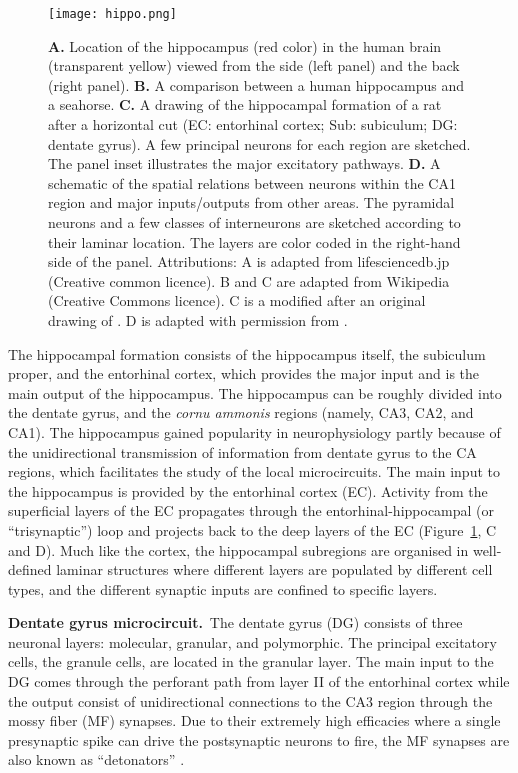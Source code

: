     \begin{figure}
      \center
      \texttt{[image: hippo.png]}
      \caption{
        {\bf A.} Location of the hippocampus (red color) in the human brain
        (transparent yellow) viewed from the side (left panel) and the back
        (right panel).
        {\bf B.} A comparison between a human hippocampus and a seahorse.
        {\bf C.} A drawing of the hippocampal formation of a rat after a
        horizontal cut (EC: entorhinal cortex; Sub: subiculum; DG: dentate
        gyrus). A few principal neurons for each region are sketched. The
        panel inset illustrates the major excitatory pathways.
        {\bf D.} A schematic of the spatial relations between neurons within
        the CA1 region and major inputs/outputs from other areas. The pyramidal
        neurons and a few classes of interneurons are sketched according to
        their laminar location. The layers are color coded in the right-hand
        side of the panel.
        Attributions:
        A is adapted from lifesciencedb.jp (Creative common licence). B and C
        are adapted from Wikipedia (Creative Commons licence). C is a modified
        after an original drawing of \cite{Cajal1911}. D is adapted with
        permission from \cite{Somogyi2014}.
             }
    \label{fig:hp}
    \end{figure}

    The hippocampal formation consists of the hippocampus itself, the
    subiculum proper, and the entorhinal cortex,
    which provides the major input and is the main output of the hippocampus.
    The hippocampus can be roughly divided into the dentate gyrus, and the {\it cornu
    ammonis} regions (namely, CA3, CA2, and CA1). The hippocampus gained
    popularity in neurophysiology partly because of the unidirectional
    transmission of information from dentate gyrus to the CA regions, which
    facilitates the study of the local microcircuits. The main input to the
    hippocampus is provided by the entorhinal cortex (EC). Activity from the
    superficial layers of the EC propagates through the entorhinal-hippocampal
    (or ``trisynaptic'') loop and projects back to the deep layers of the EC
    (Figure~\ref{fig:hp}, C and D). Much like the cortex, the
    hippocampal subregions are organised in well-defined laminar structures
    where different layers are populated by different cell types, and the
    different synaptic inputs are confined to specific layers. 

    \textbf{Dentate gyrus microcircuit.}\,
    The dentate gyrus (DG) consists of three neuronal layers: molecular,
    granular, and polymorphic. The principal excitatory cells, the granule
    cells, are located in the granular layer. The main input to the DG comes
    through the perforant path from layer II of the entorhinal cortex
    \citep{Squire1992} while the output consist of unidirectional connections
    to the CA3 region through the mossy fiber (MF) synapses. Due to their
    extremely high efficacies where a single presynaptic spike can drive the
    postsynaptic neurons to fire, the MF synapses are also known as
    ``detonators'' \citep{Bischofberger2006}.

